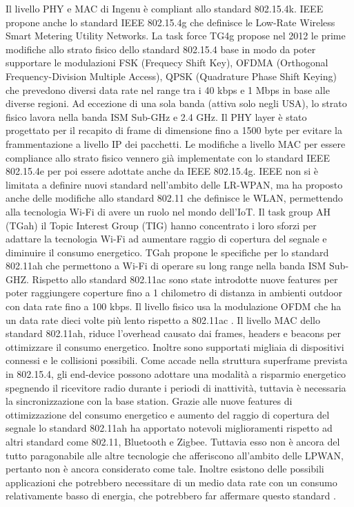 \documentclass[12pt,a4paper,openright,twoside]{report}
\begin{document}
Il livello PHY e MAC di Ingenu \`e compliant allo standard 802.15.4k.
IEEE propone anche lo standard IEEE 802.15.4g che definisce le Low-Rate Wireless Smart Metering Utility Networks. La task force TG4g propose nel 2012 le prime modifiche allo strato fisico dello standard 802.15.4 base in modo da poter supportare le modulazioni FSK (Frequecy Shift Key), OFDMA (Orthogonal Frequency-Division Multiple Access), QPSK (Quadrature Phase Shift Keying) che prevedono diversi data rate nel range tra i 40 kbps e 1 Mbps in base alle diverse regioni. Ad eccezione di una sola banda (attiva solo negli USA), lo strato fisico lavora nella banda ISM Sub-GHz e 2.4 GHz. Il PHY layer \`e stato progettato per il recapito di frame di dimensione fino a 1500 byte per evitare la frammentazione a livello IP dei pacchetti. Le modifiche a livello MAC per essere compliance allo strato fisico vennero gi\`a implementate con lo standard IEEE 802.15.4e per poi essere adottate anche da IEEE 802.15.4g.  
IEEE non si \`e limitata a definire nuovi standard nell'ambito delle LR-WPAN, ma ha proposto anche delle modifiche allo standard 802.11 che definisce le WLAN, permettendo alla tecnologia Wi-Fi di avere un ruolo nel mondo dell'IoT.   
Il task group AH (TGah) il Topic Interest Group (TIG) hanno concentrato i loro sforzi per adattare la tecnologia Wi-Fi ad aumentare raggio di copertura del segnale e diminuire il consumo energetico. 
TGah propone le specifiche per lo standard 802.11ah che permettono a Wi-Fi di operare su long range nella banda ISM Sub-GHZ. 
Rispetto allo standard 802.11ac sono state introdotte nuove features per poter raggiungere coperture fino a 1 chilometro di distanza in ambienti outdoor con data rate fino a 100 kbps. 
Il livello fisico usa la modulazione OFDM che ha un data rate dieci volte pi\`u lento rispetto a 802.11ac .
Il livello MAC dello standard 802.11ah, riduce l'overhead causato dai frames, headers e beacons per ottimizzare il consumo energetico. Inoltre sono supportati migliaia di dispositivi connessi e le collisioni possibili. 
Come accade nella struttura superframe prevista in 802.15.4, gli end-device possono adottare una modalit\`a a risparmio energetico spegnendo il ricevitore radio durante i periodi di inattivit\`a, tuttavia \`e necessaria la sincronizzazione con la base station.
Grazie alle nuove features di ottimizzazione del consumo energetico e aumento del raggio di copertura del segnale lo standard 802.11ah ha apportato notevoli miglioramenti rispetto ad altri standard come 802.11, Bluetooth e Zigbee. Tuttavia esso non \`e ancora del tutto paragonabile alle altre tecnologie che afferiscono all'ambito delle LPWAN, pertanto non \`e ancora considerato come tale. 
Inoltre esistono delle possibili applicazioni che potrebbero necessitare  di un medio data rate con un consumo relativamente basso di energia, che potrebbero far affermare questo standard \cite{K2}.
\end{document}
